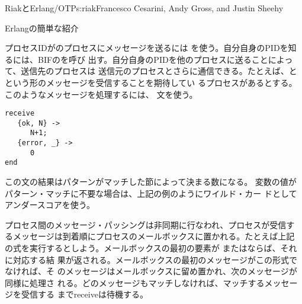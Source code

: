 \begin{aosachapter}{RiakとErlang/OTP}{s:riak}{Francesco Cesarini, Andy Gross, and Justin Sheehy}
\begin{aosasect1}{Erlangの簡単な紹介}

プロセスIDがのプロセスにメッセージを送るには
を使う。自分自身のPIDを知るには、BIFのを呼び
出す。自分自身のPIDを他のプロセスに送ることによって、送信先のプロセスは
送信元のプロセスとさらに通信できる。たとえば、と
という形のメッセージを受信することを期待してい
るプロセスがあるとする。このようなメッセージを処理するには、
文を使う。

\begin{verbatim}
receive
   {ok, N} ->
      N+1;
   {error, _} ->
      0
end
\end{verbatim}


\noindent この文の結果はパターンがマッチした節によって決まる数になる。
変数の値がパターン・マッチに不要な場合は、上記の例のようにワイルド・カー
ドとしてアンダースコアを使う。


プロセス間のメッセージ・パッシングは非同期に行なわれ、プロセスが受信す
るメッセージは到着順にプロセスのメールボックスに置かれる。たとえば上記
の式を実行するとしよう。メールボックスの最初の要素が
またはならば、それに対応する結
果が返される。メールボックスの最初のメッセージがこの形式でなければ、そ
のメッセージはメールボックスに留め置かれ、次のメッセージが同様に処理さ
れる。どのメッセージもマッチしなければ、マッチするメッセージを受信する
までreceiveは待機する。


\end{aosasect1}
\end{aosachapter}
